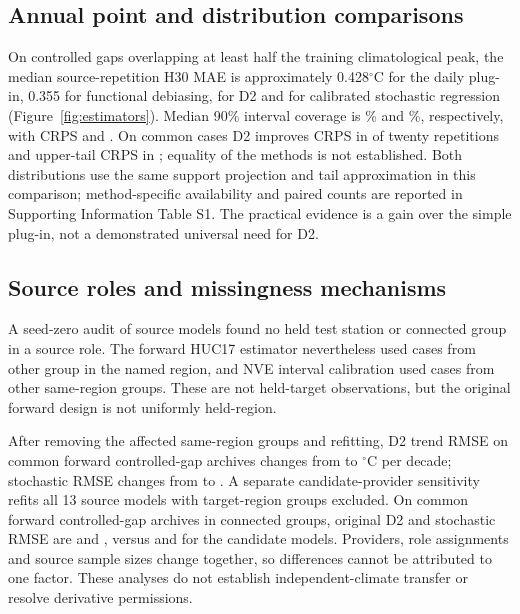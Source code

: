 \documentclass[draft,linenumbers]{agujournal2025}
\begin{document}
\subsection{Annual point and distribution comparisons}
On controlled gaps overlapping at least half the training climatological peak, the median source-repetition H30 MAE is approximately 0.428$^{\circ}$C for the daily plug-in, 0.355 for functional debiasing, \WADTwoMAE{} for D2 and \WAStochasticMAE{} for calibrated stochastic regression (Figure~\ref{fig:estimators}). Median 90\% interval coverage is \WADTwoCoverage\% and \WAStochasticCoverage\%, respectively, with CRPS \WADTwoCRPS{} and \WAStochasticCRPS{}. On common cases D2 improves CRPS in \WADTwoCRPSWins{} of twenty repetitions and upper-tail CRPS in \WADTwoTailWins{}; equality of the methods is not established. Both distributions use the same support projection and tail approximation in this comparison; method-specific availability and paired counts are reported in Supporting Information Table S1. The practical evidence is a gain over the simple plug-in, not a demonstrated universal need for D2.







\subsection{Source roles and missingness mechanisms}
A seed-zero audit of \RHModels{} source models found no held test station or connected group in a source role. The forward HUC17 estimator nevertheless used \RHHucCases{} cases from \RHHucGroups{} other group in the named region, and NVE interval calibration used \RHNveCases{} cases from \RHNveGroups{} other same-region groups. These are not held-target observations, but the original forward design is not uniformly held-region.

After removing the affected same-region groups and refitting, D2 trend RMSE on \SRPairN{} common forward controlled-gap archives changes from \SROldDTwo{} to \SRNewDTwo{} $^{\circ}$C per decade; stochastic RMSE changes from \SROldStoch{} to \SRNewStoch{}. A separate candidate-provider sensitivity refits all 13 source models with target-region groups excluded. On \OpenSourcePairs{} common forward controlled-gap archives in \OpenSourceGroups{} connected groups, original D2 and stochastic RMSE are \OpenSourceOldDTwo{} and \OpenSourceOldClassic{}, versus \OpenSourceNewDTwo{} and \OpenSourceNewClassic{} for the candidate models. Providers, role assignments and source sample sizes change together, so differences cannot be attributed to one factor. These analyses do not establish independent-climate transfer or resolve derivative permissions.
\end{document}
